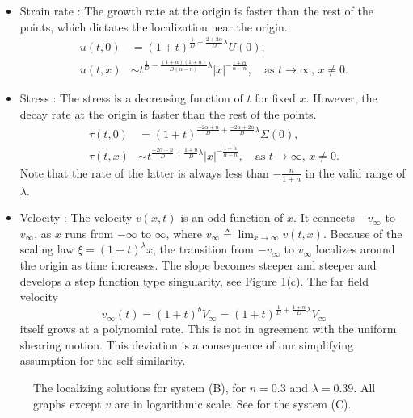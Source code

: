 \documentclass[graybox]{svmult}
\begin{document}
\begin{itemize}
\item Strain rate : The growth rate at the origin is faster than the rest of the points, which dictates the localization near the origin.
\begin{align*}
 u(t,0) &= (1+t)^{\frac{1}{D} + \frac{2+2\alpha}{D}\lambda}U(0), \\
 u(t,x) &\sim t^{\frac{1}{D} - \frac{(1+\alpha)(1+n)}{D(\alpha-n)}\lambda}|x|^{-\frac{1+\alpha}{\alpha-n}}, \quad \text{as $t \rightarrow \infty$, $x\ne0$.}
\end{align*}
\item Stress : The stress is a decreasing function of $t$ for  fixed $x$. However, the decay rate at the origin is faster than the rest of the points.
\begin{align*}
 \tau(t,0) &= (1+t)^{\frac{-2\alpha+n}{D} + \frac{-2\alpha+2n}{D}\lambda}\Sigma(0), \\
 \tau(t,x) &\sim t^{\frac{-2\alpha+n}{D} +\frac{1+n}{D}\lambda}|x|^{-\frac{1+\alpha}{\alpha-n}}, \quad \text{as $t \rightarrow \infty$, $x\ne0$.}
\end{align*}
Note that the rate of the latter is always less than $-\frac{n}{1+n}$ in the valid range of  $\lambda$.
\item Velocity : The velocity $v(x,t)$ is an odd function of $x$. It connects $-v_\infty$ to $v_\infty$, as $x$ runs from $-\infty$ to $\infty$, where $v_\infty\triangleq \lim_{x \rightarrow \infty} v(t,x)$. Because of the scaling law $\xi=(1+t)^\lambda x$, the transition from $-v_\infty$ to $v_\infty$ localizes around the origin as time increases. The slope becomes steeper and steeper and develops a step function type singularity, see Figure 1(c). The far field velocity 
$$v_\infty(t)=(1+t)^{b}V_\infty = (1+t)^{\frac{1}{D} + \frac{1+n}{D}\lambda}V_\infty$$
itself grows at a polynomial rate. This is not in agreement with the uniform shearing motion. This deviation is a consequence of our simplifying assumption for the self-similarity.
\end{itemize}

\begin{figure}[ht]
  \centering
\caption{The localizing solutions for system (B), for $n=0.3$ and $\lambda =0.39$. 
 All graphs except $v$ are in logarithmic scale. See \cite{KLT_2016} for the system (C).} 
\end{figure}
\end{document}
